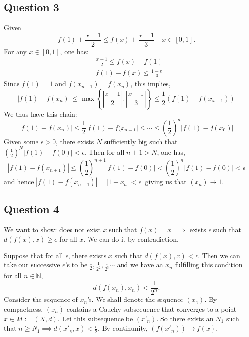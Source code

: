 \documentclass{article}
\begin{document}
\subsection*{Question 3}
Given
\begin{equation*}
    f(1) + \frac{x-1}{2} \leq f(x) + \frac{x-1}{3} \ \ \ : x \in [0, 1].
\end{equation*}
For any $x \in [0,1]$, one has:
\begin{align*}
    &\frac{x-1}{2} \leq f(x) - f(1)  \\
    &f(1) - f(x) \leq \frac{1-x}{3}
\end{align*}
Since $f(1)=1$ and $f(x_{n-1})=f(x_n)$, this implies,
\begin{equation*}
    |f(1)-f(x_n)| \leq \max\left\{\left| \frac{x-1}{2} \right|, \left| \frac{x-1}{3} \right|\right\} \leq \frac{1}{2} (f(1) -f(x_{n-1}))
\end{equation*}
We thus have this chain:
\begin{equation*}
    |f(1)-f(x_n)| \leq \frac{1}{2} |f(1)-f(x_{n-1}| \leq \cdots \leq \left( \frac{1}{2} \right)^n |f(1)-f(x_0)|
\end{equation*}
Given some $\epsilon>0$, there exists $N$ sufficiently big such that $\left( \frac{1}{2}\right)^N |f(1)-f(0)| < \epsilon$.
Then for all $n+1>N$, one has,
\begin{equation*}
    |f(1)-f(x_{n+1})| \leq \left(\frac{1}{2}\right)^{n+1} |f(1)-f(0)| < \left(\frac{1}{2}\right)^{n} |f(1)-f(0)| < \epsilon
\end{equation*}
and hence $|f(1)-f(x_{n+1})|=|1-x_n|<\epsilon$, giving us that $(x_n) \to 1$.

\subsection*{Question 4}
We want to show: does not exist $x$ such that $f(x)=x$ $\implies$ exists $\epsilon$ such that $d(f(x), x) \geq \epsilon$ for all $x$. We can do it by contradiction.

Suppose that for all $\epsilon$, there exists $x$ such that $d(f(x), x)<\epsilon$. Then we can take our successive $\epsilon$'s to be $\frac{1}{2}, \frac{1}{2^2}, \frac{1}{2^3} \cdots$ and we have an $x_n$ fulfilling this condition for all $n \in \mathbb{N}$,
\begin{equation}
    d(f(x_n), x_n) < \frac{1}{2^n}. \label{eq1}
\end{equation}
Consider the sequence of $x_n$'s. We shall denote the sequence $(x_n)$. By compactness, $(x_n)$ contains a Cauchy subsequence that converges to a point $x \in M:=(X,d)$. Let this subsequence be $(x'_n)$. So there exists an $N_1$ such that $n \geq N_1 \implies d(x'_n, x) < \frac{\epsilon}{2}$.
By continunity, $(f(x'_n)) \to f(x)$.
\end{document}
